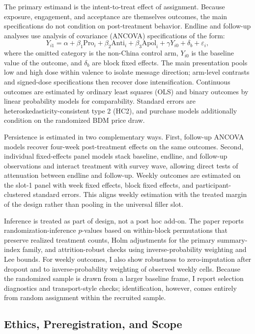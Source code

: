 \documentclass[12pt,american]{article}
\begin{document}
The primary estimand is the intent-to-treat effect of assignment. Because exposure, engagement, and acceptance are themselves outcomes, the main specifications do not condition on post-treatment behavior. Endline and follow-up analyses use analysis of covariance (ANCOVA) specifications of the form:
	\[
	Y_{i1} = \alpha + \beta_1 \text{Pro}_i + \beta_2 \text{Anti}_i + \beta_3 \text{Apol}_i + \gamma Y_{i0} + \delta_b + \varepsilon_i,
	\]
where the omitted category is the non-China control arm, \(Y_{i0}\) is the baseline value of the outcome, and \(\delta_b\) are block fixed effects. The main presentation pools low and high dose within valence to isolate message direction; arm-level contrasts and signed-dose specifications then recover dose intensification. Continuous outcomes are estimated by ordinary least squares (OLS) and binary outcomes by linear probability models for comparability. Standard errors are heteroskedasticity-consistent type 2 (HC2), and purchase models additionally condition on the randomized BDM price draw.
	
Persistence is estimated in two complementary ways. First, follow-up ANCOVA models recover four-week post-treatment effects on the same outcomes. Second, individual fixed-effects panel models stack baseline, endline, and follow-up observations and interact treatment with survey wave, allowing direct tests of attenuation between endline and follow-up. Weekly outcomes are estimated on the slot-1 panel with week fixed effects, block fixed effects, and participant-clustered standard errors. This aligns weekly estimation with the treated margin of the design rather than pooling in the universal filler slot.
	
Inference is treated as part of design, not a post hoc add-on. The paper reports randomization-inference \(p\)-values based on within-block permutations that preserve realized treatment counts, Holm adjustments for the primary summary-index family, and attrition-robust checks using inverse-probability weighting and Lee bounds. For weekly outcomes, I also show robustness to zero-imputation after dropout and to inverse-probability weighting of observed weekly cells. Because the randomized sample is drawn from a larger baseline frame, I report selection diagnostics and transport-style checks; identification, however, comes entirely from random assignment within the recruited sample.
	
	\subsection*{Ethics, Preregistration, and Scope}
	
\end{document}
